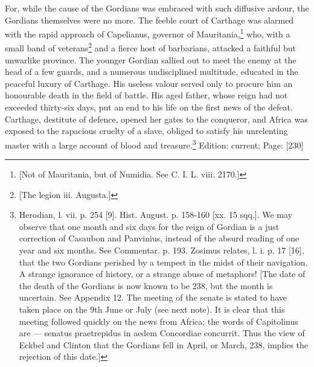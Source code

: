For, while the cause of the Gordians was embraced with such diffusive ardour, the Gordians themselves were no more. The feeble court of Carthage was alarmed with the rapid approach of Capelianus, governor of Mauritania,\footnote{[Not of Mauritania, but of Numidia. See C. I. L. viii. 2170.]} who, with a small band of veterans\footnote{[The legion iii. Augusta.]} and a fierce host of barbarians, attacked a faithful but unwarlike province. The younger Gordian sallied out to meet the enemy at the head of a few guards, and a numerous undisciplined multitude, educated in the peaceful luxury of Carthage. His useless valour served only to procure him an honourable death in the field of battle. His aged father, whose reign had not exceeded thirty-six days, put an end to his life on the first news of the defeat. Carthage, destitute of defence, opened her gates to the conqueror, and Africa was exposed to the rapacious cruelty of a slave, obliged to satisfy his unrelenting master with a large account of blood and treasure.\footnote{Herodian, l. vii. p. 254 [9]. Hist. August. p. 158-160 [xx. 15 sqq.]. We may observe that one month and six days for the reign of Gordian is a just correction of Casaubon and Panvinius, instead of the absurd reading of one year and six months. See Commentar. p. 193. Zosimus relates, l. i. p. 17 [16], that the two Gordians perished by a tempest in the midst of their navigation. A strange ignorance of history, or a strange abuse of metaphors! [The date of the death of the Gordians is now known to be 238, but the month is uncertain. See Appendix 12. The meeting of the senate is stated to have taken place on the 9th June or July (see next note). It is clear that this meeting followed quickly on the news from Africa; the words of Capitolinus are \texthebrew{—} senatus praetrepidus in aedem Concordiae concurrit. Thus the view of Eckbel and Clinton that the Gordians fell in April, or March, 238, implies the rejection of this date.]}
Edition: current; Page: [230]

